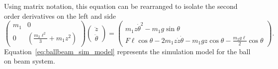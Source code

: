 Using matrix notation, this equation can be rearranged to isolate the second order derivatives on the left and side
\begin{equation}\label{eq:ballbeam_sim_model}
\begin{pmatrix}
m_1 & 0  \\ 
0 & \left( \frac{m_2 \ell^2}{3} + m_1 z^2 \right)
\end{pmatrix} 
	\begin{pmatrix}\ddot{z} \\ \ddot{\theta} \end{pmatrix}
= \begin{pmatrix}   m_1 z \dot{\theta}^2 - m_1 g \sin\theta \\ F \ell \cos\theta - 2 m_1 z \dot{z} \dot{\theta} - m_1 g z \cos\theta 
	- \frac{m_2 g \ell}{2} \cos\theta \end{pmatrix}.
\end{equation}
Equation~\eqref{eq:ballbeam_sim_model} represents the simulation model for the ball on beam system.





